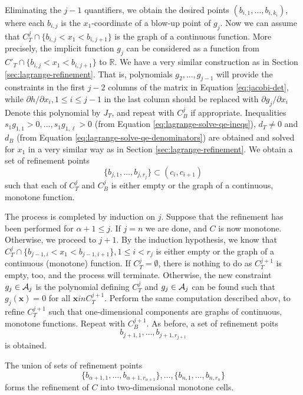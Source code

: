 \documentclass[
]{book}
\theoremstyle{definition}
\theoremstyle{definition}
\theoremstyle{definition}
\theoremstyle{definition}
\theoremstyle{remark}
\begin{document}
Eliminating the \(j-1\) quantifiers, we obtain the desired points \((b_{i,1},\ldots,b_{i,k_i})\), where each \(b_{i,j}\) is the \(x_1\)-coordinate of a blow-up point of \(g_j\).
Now we can assume that \(C^j_T\cap \{ b_{i,j} < x_1 < b_{i,j+1}\}\) is the graph of a continuous function. More precisely, the implicit function \(g_j\) can be considered as a function from \(C'_T \cap \{ b_{i,j} < x_1 < b_{i,j+1}\}\) to \(\mathbb{R}\). We have a very similar construction as in Section \ref{sec:lagrange-refinement}.
That is, polynomials \(g_2,\ldots,g_{j-1}\) will provide the constraints in the first \(j-2\) columns of the matrix in Equation \eqref{eq:jacobi-det}, while \(\partial h / \partial x_i, 1 \le i \le j - 1\) in the last column should be replaced with \(\partial g_j / \partial x_i\)
Denote this polynomial by \(J_T\), and repeat with \(C^j_B\) if appropriate. Inequalities \(s_1 g_{1,1} > 0, \ldots, s_1 g_{1,\ell} > 0\) (from Equation \eqref{eq:lagrange-solve-qe-ineqs}), \(d_T \ne 0\) and \(d_B\) (from Equation \eqref{eq:lagrange-solve-qe-denominators}) are obtained and solved for \(x_1\) in a very similar way as in Section \ref{sec:lagrange-refinement}. We obtain a set of refinement points
\[
\{ b_{j,1}, \ldots, b_{j,r_j} \} \subset (c_i,c_{i+1})
\]
such that each of \(C^j_T\) and \(C^j_B\) is either empty or the graph of a continuous, monotone function.

The process is completed by induction on \(j\). Suppose that the refinement has been performed for \(\alpha + 1 \le j\). If \(j = n\) we are done, and \(C\) is now monotone. Otherwise, we proceed to \(j+1\). By the induction hypothesis, we know that \(C^{j}_T \cap \{b_{j-1,i} < x_1 < b_{j-1,i+1}\}, 1 \le i < r_{j}\) is either empty or the graph of a continuous (monotone) function.
If \(C^{j}_T = \emptyset\), there is nothing to do as \(C^{j+1}_T\) is empty, too, and the process will terminate.
Otherwise, the new constraint \(g_{j} \in {\cal A}_{j}\) is the polynomial defining \(C^{j}_T\) and \(g_j \in {\cal A}_j\) can be found such that \(g_j(\mathbf{x}) = 0\) for all \(\mathbf{x} in C^{j+1}_T\).
Perform the same computation described abov, to refine \(C^{j+1}_T\) such that one-dimensional components are graphs of continuous, monotone functions. Repeat with \(C^{j+1}_B\).
As before, a set of refinement poits
\[
b_{j+1,1}, \ldots, b_{j+1,r_{j+1}}
\]
is obtained.

The union of sets of refinement points \[
\{b_{\alpha + 1,1}, \ldots, b_{\alpha + 1,r_{\alpha + 1}}\}, \ldots, \{b_{n,1}, \ldots, b_{n,r_n}\}
\]
forms the refinement of \(C\) into two-dimensional monotone cells.
\end{document}
